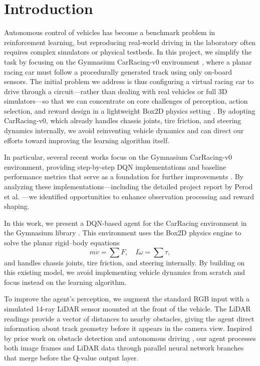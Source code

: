 \section{Introduction}

Autonomous control of vehicles has become a benchmark problem in reinforcement learning, but reproducing real‐world driving in the laboratory often requires complex simulators or physical testbeds. In this project, we simplify the task by focusing on the Gymnasium CarRacing-v0 environment \cite{gymnasium2023}, where a planar racing car must follow a procedurally generated track using only on‐board sensors. The initial problem we address is thus configuring a virtual racing car to drive through a circuit—rather than dealing with real vehicles or full 3D simulators—so that we can concentrate on core challenges of perception, action selection, and reward design in a lightweight Box2D physics setting \cite{gymnasium2023}. By adopting CarRacing-v0, which already handles chassis joints, tire friction, and steering dynamics internally, we avoid reinventing vehicle dynamics and can direct our efforts toward improving the learning algorithm itself.

In particular, several recent works focus on the Gymnasium CarRacing-v0 environment, providing step-by-step DQN implementations and baseline performance metrics that serve as a foundation for further improvements \cite{perod2019}. By analyzing these implementations—including the detailed project report by Perod et al. \cite{perod2019}—we identified opportunities to enhance observation processing and reward shaping.


In this work, we present a DQN-based agent for the CarRacing environment in the Gymnasium library \cite{gymnasium2023}. This environment uses the Box2D physics engine to solve the planar rigid–body equations
\[
m\dot v = \sum F,\quad I\dot \omega = \sum \tau,
\]
and handles chassis joints, tire friction, and steering internally. By building on this existing model, we avoid implementing vehicle dynamics from scratch and focus instead on the learning algorithm.

To improve the agent’s perception, we augment the standard RGB input with a simulated 14-ray LiDAR sensor mounted at the front of the vehicle. The LiDAR readings provide a vector of distances to nearby obstacles, giving the agent direct information about track geometry before it appears in the camera view. Inspired by prior work on obstacle detection and autonomous driving \cite{Estrada2021}, our agent processes both image frames and LiDAR data through parallel neural network branches that merge before the Q-value output layer.

